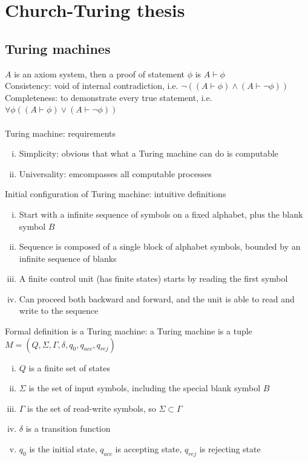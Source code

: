\documentclass{article}
\newcommand*{\<}{\langle}
\renewcommand*{\>}{\rangle}
\begin{document}
	\section{Church-Turing thesis}
		\subsection{Turing machines}
			$A$ is an axiom system, then a proof of statement $\phi$ is $A \vdash \phi$ \\
			Consistency: void of internal contradiction, i.e. $\neg((A \vdash \phi) \land (A \vdash \neg\phi))$ \\
			Completeness: to demonstrate every true statement, i.e. $\forall\phi((A \vdash \phi) \lor (A \vdash \neg\phi))$ \\
			\\
			Turing machine: requirements
			\begin{enumerate}[(i)]
				\item Simplicity: obvious that what a Turing machine can do is computable
				\item Universality: emcompasses all computable processes
				\end{enumerate}
			Initial configuration of Turing machine: intuitive definitions 
			\begin{enumerate}[(i)]
				\item Start with a infinite sequence of symbols on a fixed alphabet, plus the blank symbol $B$ 
				\item Sequence is composed of a single block of alphabet symbols, bounded by an infinite sequence of blanks 
				\item A finite control unit (has finite states) starts by reading the first symbol
				\item Can proceed both backward and forward, and the unit is able to read and write to the sequence
				\end{enumerate}
			Formal definition is a Turing machine: a Turing machine is a tuple $M = (Q, \Sigma, \Gamma, \delta, q_0, q_{acc}, q_{rej})$
			\begin{enumerate}[(i)]
				\item $Q$ is a finite set of states
				\item $\Sigma$ is the set of input symbols, including the special blank symbol $B$
				\item $\Gamma$ is the set of read-write symbols, so $\Sigma \subset \Gamma$
				\item $\delta$ is a transition function 
				\item $q_0$ is the initial state, $q_{acc}$ is accepting state, $q_{rej}$ is rejecting state
				\end{enumerate}
\end{document}
